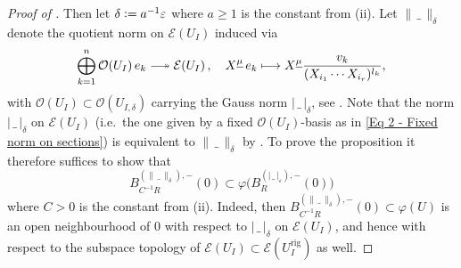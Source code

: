 \documentclass[a4paper, reqno, 10pt]{amsart}
\theoremstyle{definition}
\numberwithin{equation}{section}
\newcommand{\abs}[1]{{\lvert{#1}\rvert}}
\newcommand{\blank}{{\,\_\,}}
\newcommand{\defeq}{\vcentcolon=}
\newcommand{\lto}{\longmapsto}
\newcommand{\rig}{{\mathrm{rig}}}
\newcommand{\ul}[1]{{\underline{#1}}}
\newcommand{\CE}{{\mathcal {E}}}
\newcommand{\CO}{{\mathcal {O}}}
\DeclareRobustCommand\longtwoheadrightarrow
{\relbar\joinrel\twoheadrightarrow}
\begin{document}
\begin{proof}[{Proof of }]
	
	Then let $\delta \defeq a^{-1} \varepsilon$ where $a \geq 1$ is the constant from  (ii).
	Let $\lVert\blank\rVert_\delta$ denote the quotient norm on $\CE(U_I)$ induced via 
	\begin{equation*}\label{Eq 3 - Epimorphism with homogeneous generators of sections}
		\bigoplus_{k=1}^n \CO(U_I) \, e_k \longtwoheadrightarrow \CE(U_I)\,,\quad X^\ul{\mu} \, e_k \lto X^\ul{\mu} \frac{v_k}{(X_{i_1}\cdots X_{i_r})^{l_k}} ,
	\end{equation*}
	with $\CO(U_I)\subset \CO(U_{I,\delta})$ carrying the Gauss norm $\abs{\blank}_\delta$, see .
	Note that the norm $\lvert\blank\rvert_\delta$ on $\CE(U_I)$ (i.e.\ the one given by a fixed $\CO(U_I)$-basis as in \eqref{Eq 2 - Fixed norm on sections}) is equivalent to $\lVert\blank\rVert_\delta$ by \cite[3.7.3 Prop.\ 3]{BoschGuentzerRemmert84NonArchAna}.	
	To prove the proposition it therefore suffices to show that
	\begin{equation}\label{Eq 3 - Inclusion of balls}
		B_{C^{-1} R}^{(\lVert\blank\rVert_\delta), - } (0) \subset \varphi \big( B_{R}^{(\abs{\blank}_\varepsilon), - } (0) \big)
	\end{equation}
	where $C>0$ is the constant from  (ii).
	Indeed, then $B_{C^{-1} R}^{(\lVert\blank\rVert_\delta), - } (0)  \subset \varphi(U)$ is an open neighbourhood of $0$ with respect to $\lvert\blank\rvert_\delta$ on $\CE(U_I)$, and hence with respect to the subspace topology of $\CE(U_I)\subset \CE(U_I^\rig)$ as well.
	
	
	

\end{proof}
\end{document}
